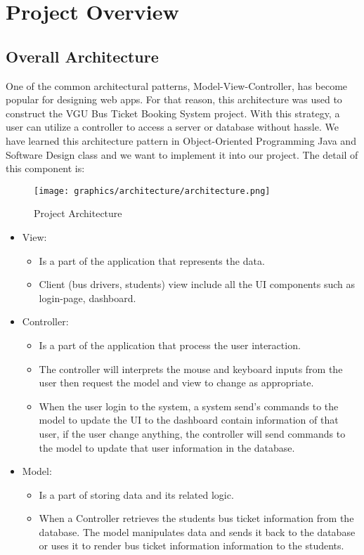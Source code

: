 \section{Project Overview}

\subsection{Overall Architecture}
\noindent One of the common architectural patterns, Model-View-Controller, has become popular for designing web apps. For that reason, this architecture was used to construct the VGU Bus Ticket Booking System project. With this strategy, a user can utilize a controller to access a server or database without hassle. We have learned this architecture pattern in Object-Oriented Programming Java and Software Design class and we want to implement it into our project. The detail of this component is: 

    \begin{figure}[H]
        \centering
        \texttt{[image: graphics/architecture/architecture.png]}
        \caption{Project Architecture}
        \label{fig:projectarchitecture}
    \end{figure}
    
\begin{itemize}
    \item View:
        \begin{itemize}
            \item  Is a part of the application that represents the data.
            \item Client (bus drivers, students) view include all the UI components such as login-page, dashboard.
        \end{itemize}
    \item Controller:
        \begin{itemize}
            \item Is a part of the application that process the user interaction.
            \item The controller will interprets the mouse and keyboard inputs from the user then request the model and view to change as appropriate.
            \item When the user login to the system, a system send’s commands to the model to update the UI to the dashboard contain information of that user, if the user change anything, the controller will send commands to the model to update that user information in the database.
        \end{itemize}
    \item Model:
        \begin{itemize}
            \item Is a part of storing data and its related logic.
            \item When a Controller retrieves the students bus ticket information from the database. The model manipulates data and sends it back to the database or uses it to render bus ticket information information to the students.
        \end{itemize}
\end{itemize}

